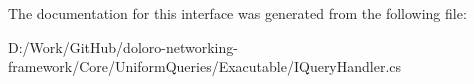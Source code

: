 The documentation for this interface was generated from the following file\+:\begin{DoxyCompactItemize}
\item 
D\+:/\+Work/\+Git\+Hub/doloro-\/networking-\/framework/\+Core/\+Uniform\+Queries/\+Exacutable/I\+Query\+Handler.\+cs\end{DoxyCompactItemize}

